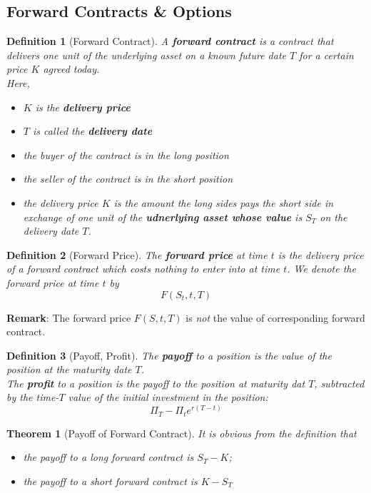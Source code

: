 \documentclass[12pt]{article}
\newtheorem{definition}{Definition}[section]
\newtheorem{theorem}{Theorem}[section]
\theoremstyle{definition}
\begin{document}
\subsection{Forward Contracts \& Options}
\begin{definition}[Forward Contract]
\normalfont A \textbf{forward contract} is a contract that delivers one unit of the underlying asset on a known future date $T$ for a certain price $K$ agreed today.\\
Here,
\begin{itemize}
  \item $K$ is the \textbf{delivery price}
  \item $T$ is called the \textbf{delivery date}
  \item the buyer of the contract is in the long position
  \item the seller of the contract is in the short position
  \item the delivery price $K$ is the amount the long sides pays the short side in exchange of one unit of the \textbf{udnerlying asset whose value} is $S_T$ on the delivery date $T$.
\end{itemize}
\end{definition}
\begin{definition}[Forward Price]
\normalfont The \textbf{forward price} at time $t$ is the delivery price of a forward contract which costs nothing to enter into at time $t$.
We denote the forward price at time $t$ by
\[
F(S_t, t, T)
\]
\end{definition}
\textbf{Remark}: The forward price $F(S,t,T)$ is \textit{not} the value of corresponding forward contract.
\begin{definition}[Payoff, Profit]
\normalfont The \textbf{payoff} to a position is the value of the position at the maturity date $T$.\\
The \textbf{profit} to a position is the payoff to the position at maturity dat $T$, subtracted by the time-$T$ value of the initial investment in the position:
\[
\Pi_T-\Pi_te^{r(T-t)}
\]
\end{definition}
\begin{theorem}[Payoff of Forward Contract]
\normalfont It is obvious from the definition that 
\begin{itemize}
  \item the payoff to a long forward contract is $S_T-K$;
  \item the payoff to a short forward contract is $K-S_T$
\end{itemize}
\end{theorem}
\end{document}
